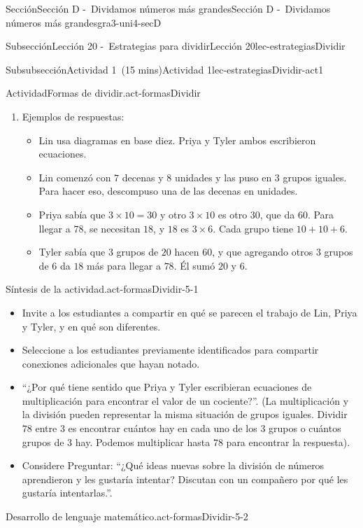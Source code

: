 \documentclass[oneside,10pt,]{article}
\begin{document}
\begin{sectionptx}{Sección}{Sección D -~Dividamos números más grandes}{}{Sección D -~Dividamos números más grandes}{}{}{gra3-uni4-secD}
\begin{subsectionptx}{Subsección}{Lección 20 -~Estrategias para dividir}{}{Lección 20}{}{}{lec-estrategiasDividir}
\begin{subsubsectionptx}{Subsubsección}{Actividad 1~(15 mins)}{}{Actividad 1}{}{}{lec-estrategiasDividir-act1}
\begin{activity}{Actividad}{Formas de dividir.}{act-formasDividir}
\begin{enumerate}
\begin{itemize}[label=\textbullet]
\item{}Podemos ver las decenas y unidades, y el \(3\), \(20\) y \(6\), en el trabajo de todos.%
\end{itemize}
\item{}Ejemplos de respuestas:%
%
\begin{itemize}[label=\textbullet]
\item{}Lin usa diagramas en base diez. Priya y Tyler ambos escribieron ecuaciones.%
\item{}Lin comenzó con \(7\) decenas y \(8\) unidades y las puso en \(3\) grupos iguales. Para hacer eso, descompuso una de las decenas en unidades.%
\item{}Priya sabía que \(3 \times 10 = 30\) y otro \(3 \times 10\) es otro \(30\), que da \(60\). Para llegar a \(78\), se necesitan \(18\), y \(18\) es \(3 \times 6\). Cada grupo tiene \(10+10+6\).%
\item{}Tyler sabía que \(3\) grupos de \(20\) hacen \(60\), y que agregando otros \(3\) grupos de \(6\) da \(18\) más para llegar a \(78\). Él sumó \(20\) y \(6\).%
\end{itemize}
\end{enumerate}
\end{activity}%
\par
\begin{paragraphs}{Síntesis de la actividad.}{act-formasDividir-5-1}%
%
\begin{itemize}[label=\textbullet]
\item{}Invite a los estudiantes a compartir en qué se parecen el trabajo de Lin, Priya y Tyler, y en qué son diferentes.%
\item{}Seleccione a los estudiantes previamente identificados para compartir conexiones adicionales que hayan notado.%
\item{}``¿Por qué tiene sentido que Priya y Tyler escribieran ecuaciones de multiplicación para encontrar el valor de un cociente?''. (La multiplicación y la división pueden representar la misma situación de grupos iguales. Dividir \(78\) entre \(3\) es encontrar cuántos hay en cada uno de los \(3\) grupos o cuántos grupos de \(3\) hay. Podemos multiplicar hasta \(78\) para encontrar la respuesta).%
\item{}Considere Preguntar: ``¿Qué ideas nuevas sobre la división de números aprendieron y les gustaría intentar? Discutan con un compañero por qué les gustaría intentarlas.''.%
\end{itemize}
\end{paragraphs}%
\begin{paragraphs}{Desarrollo de lenguaje matemático.}{act-formasDividir-5-2}%

\end{paragraphs}
\end{subsubsectionptx}
\end{subsectionptx}
\end{sectionptx}
\end{document}
